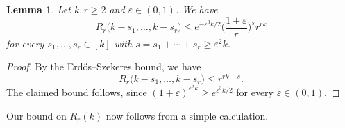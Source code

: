 \documentclass[12pt,reqno]{amsart}
\newtheorem{lemma}[theorem]{Lemma}
\theoremstyle{definition}
\theoremstyle{remark}
\newcommand\eps{\varepsilon}
\renewcommand{\le}{\leqslant}
\renewcommand{\ge}{\geqslant}
\def\eps{\varepsilon}
\begin{document}
%
\begin{lemma}
	\label{lem:many:ESz:steps}
	Let\/ \(k,r \ge 2\) and\/ \(\eps \in (0,1)\). We have
	\begin{equation*}
		R_r\big( k - s_1, \ldots, k - s_r \big) \le e^{-\eps^3 k / 2} \bigg( \frac{1+\eps}{r} \bigg)^s r^{rk}
	\end{equation*}
	for every \(s_1,\ldots,s_r \in [k]\) with\/ \(s = s_1 + \cdots + s_r \ge \eps^2 k\).
\end{lemma}
%
\begin{proof}
	By the Erd\H{o}s--Szekeres bound, we have
	\begin{equation*}
		R_r\big( k - s_1, \ldots, k - s_r \big) \le r^{rk - s}.
	\end{equation*}
	The claimed bound follows, since \(( 1 + \eps )^{\eps^2 k} \ge e^{\eps^3 k/2}\) for every \(\eps \in (0,1)\).
\end{proof}
%

Our bound on \(R_r(k)\) now follows from a simple calculation.
\end{document}
